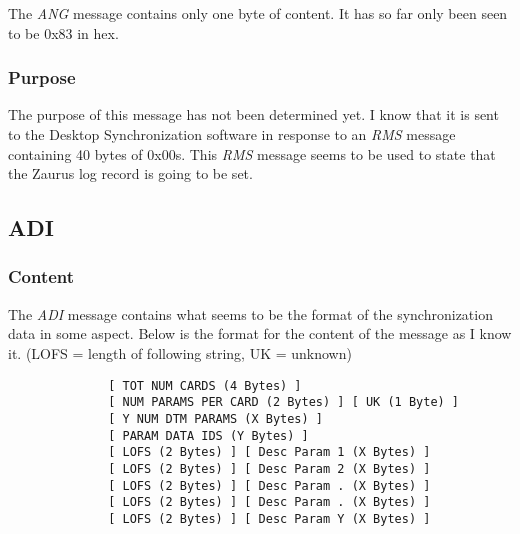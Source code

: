             The \emph{ANG} message contains only one byte of content. It has
            so far only been seen to be 0x83 in hex.

            \subsubsection{Purpose}

            The purpose of this message has not been determined yet. I know
            that it is sent to the Desktop Synchronization software in
            response to an \emph{RMS} message containing 40 bytes of
            0x00s. This \emph{RMS} message seems to be used to state that the
            Zaurus log record is going to be set.

        \subsection{ADI}

            \subsubsection{Content}

            The \emph{ADI} message contains what seems to be the format of the
            synchronization data in some aspect. Below is the format for the
            content of the message as I know it. (LOFS = length of following
            string, UK = unknown)

            \begin{verbatim}
              [ TOT NUM CARDS (4 Bytes) ]
              [ NUM PARAMS PER CARD (2 Bytes) ] [ UK (1 Byte) ]
              [ Y NUM DTM PARAMS (X Bytes) ]
              [ PARAM DATA IDS (Y Bytes) ]
              [ LOFS (2 Bytes) ] [ Desc Param 1 (X Bytes) ]
              [ LOFS (2 Bytes) ] [ Desc Param 2 (X Bytes) ]
              [ LOFS (2 Bytes) ] [ Desc Param . (X Bytes) ]
              [ LOFS (2 Bytes) ] [ Desc Param . (X Bytes) ]
              [ LOFS (2 Bytes) ] [ Desc Param Y (X Bytes) ]
            \end{verbatim}

